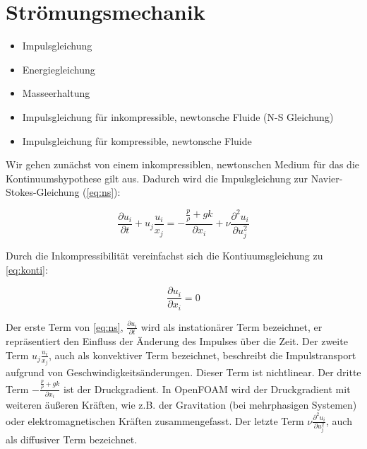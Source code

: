 \chapter{Strömungsmechanik}

\begin{itemize}
	\item Impulsgleichung
	\item Energiegleichung
	\item Masseerhaltung
	\item Impulsgleichung für inkompressible, newtonsche Fluide (N-S Gleichung)
	\item Impulsgleichung für kompressible, newtonsche Fluide 
\end{itemize}

Wir gehen zunächst von einem inkompressiblen, newtonschen Medium für das die Kontinuumshypothese gilt aus. Dadurch wird die Impulsgleichung zur Navier-Stokes-Gleichung (\autoref{eq:ns}):

\begin{equation}
	\label{eq:ns}
	\frac{\partial u_{i}}{\partial t} + u_{j} \frac{u_{i}}{x_{j}} = - \frac{ \frac{p}{\rho} + g k}{\partial x_{i}} + \nu \frac{\partial^{2} u_{i}}{\partial u_{j}^{2}}
\end{equation}

Durch die Inkompressibilität vereinfachst sich die Kontiuumsgleichung zu \autoref{eq:konti}:

\begin{equation}
	\label{eq:konti}
	\frac{\partial u_{i}}{\partial x_{i}} = 0
\end{equation}

Der erste Term von \autoref{eq:ns}, $ \frac{\partial u_{i}}{\partial t} $ wird als instationärer Term bezeichnet, er repräsentiert den Einfluss der Änderung des Impulses über die Zeit. Der zweite Term $ u_{j} \frac{u_{i}}{x_{j}} $, auch als konvektiver Term bezeichnet, beschreibt die Impulstransport aufgrund von Geschwindigkeitsänderungen. Dieser Term ist nichtlinear. 
Der dritte Term $ - \frac{ \frac{p}{\rho} + g k}{\partial x_{i}} $ ist der Druckgradient. In OpenFOAM wird der Druckgradient mit weiteren äußeren Kräften, wie z.B. der Gravitation (bei mehrphasigen Systemen) oder elektromagnetischen Kräften zusammengefasst. 
Der letzte Term $ \nu \frac{\partial^{2} u_{i}}{\partial u_{j}^{2}} $, auch als diffusiver Term bezeichnet. 

\newpage